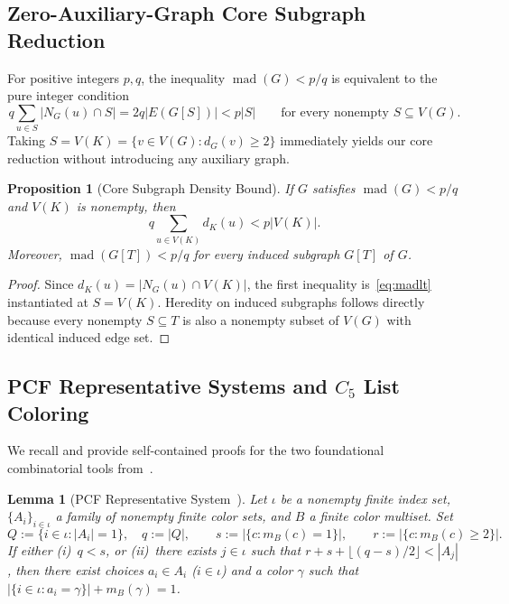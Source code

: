 \documentclass[11pt,a4paper]{article}
\newtheorem{lemma}[theorem]{Lemma}
\newtheorem{proposition}[theorem]{Proposition}
\theoremstyle{definition}
\newcommand{\mad}{\operatorname{mad}}
\begin{document}
\subsection{Zero-Auxiliary-Graph Core Subgraph Reduction}

For positive integers $p, q$, the inequality $\mad(G) < p/q$ is equivalent to the pure integer condition
\begin{equation}\label{eq:madlt}
  q \sum_{u \in S} |N_G(u) \cap S| = 2q |E(G[S])| < p|S| \qquad \text{for every nonempty } S \subseteq V(G).
\end{equation}
Taking $S = V(K) = \{v \in V(G) : d_G(v) \ge 2\}$ immediately yields our core reduction without introducing any auxiliary graph.

\begin{proposition}[Core Subgraph Density Bound]\label{prop:core-mad}
If $G$ satisfies $\mad(G) < p/q$ and $V(K)$ is nonempty, then
\[
  q \sum_{u \in V(K)} d_K(u) < p |V(K)|.
\]
Moreover, $\mad(G[T]) < p/q$ for every induced subgraph $G[T]$ of $G$.
\end{proposition}

\begin{proof}
Since $d_K(u) = |N_G(u) \cap V(K)|$, the first inequality is~\eqref{eq:madlt} instantiated at $S = V(K)$. Heredity on induced subgraphs follows directly because every nonempty $S \subseteq T$ is also a nonempty subset of $V(G)$ with identical induced edge set.
\end{proof}

\subsection{PCF Representative Systems and \texorpdfstring{$C_5$}{C5} List Coloring}

We recall and provide self-contained proofs for the two foundational combinatorial tools from~\cite{LuYingSong2026}.

\begin{lemma}[PCF Representative System~\cite{LuYingSong2026}]\label{lem:pcf-rep}
Let $\iota$ be a nonempty finite index set, $\{A_i\}_{i \in \iota}$ a family of nonempty finite color sets, and $B$ a finite color multiset. Set
\[
  Q := \{i \in \iota : |A_i| = 1\}, \quad q := |Q|, \qquad
  s := |\{c : m_B(c) = 1\}|, \qquad r := |\{c : m_B(c) \ge 2\}|.
\]
If either (i)~$q < s$, or (ii)~there exists $j \in \iota$ such that $r + s + \lfloor (q - s)/2 \rfloor < |A_j|$, then there exist choices $a_i \in A_i$ ($i \in \iota$) and a color $\gamma$ such that $|\{i \in \iota : a_i = \gamma\}| + m_B(\gamma) = 1$.
\end{lemma}
\end{document}
